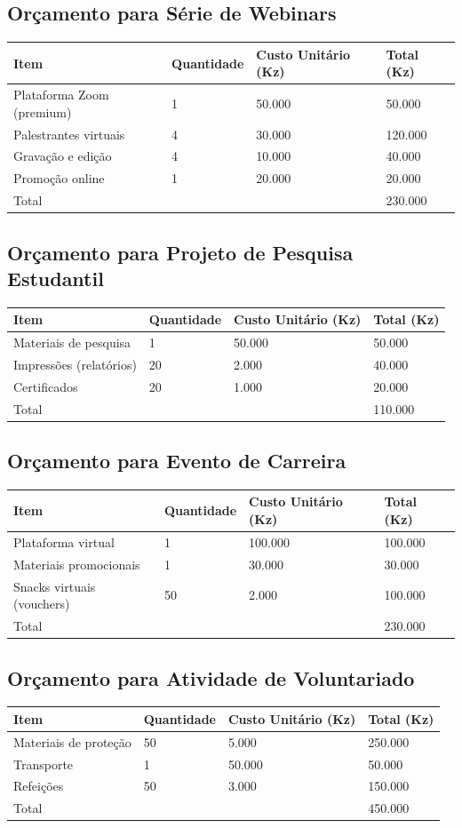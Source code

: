 \documentclass[12pt]{article}
\begin{document}
\subsection{Orçamento para Série de Webinars}
\begin{longtable}{|l|l|l|l|}
\hline
Item & Quantidade & Custo Unitário (Kz) & Total (Kz) \\
\hline
Plataforma Zoom (premium) & 1 & 50.000 & 50.000 \\
Palestrantes virtuais & 4 & 30.000 & 120.000 \\
Gravação e edição & 4 & 10.000 & 40.000 \\
Promoção online & 1 & 20.000 & 20.000 \\
\hline
Total & & & 230.000 \\
\hline
\end{longtable}

\subsection{Orçamento para Projeto de Pesquisa Estudantil}
\begin{longtable}{|l|l|l|l|}
\hline
Item & Quantidade & Custo Unitário (Kz) & Total (Kz) \\
\hline
Materiais de pesquisa & 1 & 50.000 & 50.000 \\
Impressões (relatórios) & 20 & 2.000 & 40.000 \\
Certificados & 20 & 1.000 & 20.000 \\
\hline
Total & & & 110.000 \\
\hline
\end{longtable}

\subsection{Orçamento para Evento de Carreira}
\begin{longtable}{|l|l|l|l|}
\hline
Item & Quantidade & Custo Unitário (Kz) & Total (Kz) \\
\hline
Plataforma virtual & 1 & 100.000 & 100.000 \\
Materiais promocionais & 1 & 30.000 & 30.000 \\
Snacks virtuais (vouchers) & 50 & 2.000 & 100.000 \\
\hline
Total & & & 230.000 \\
\hline
\end{longtable}

\subsection{Orçamento para Atividade de Voluntariado}
\begin{longtable}{|l|l|l|l|}
\hline
Item & Quantidade & Custo Unitário (Kz) & Total (Kz) \\
\hline
Materiais de proteção & 50 & 5.000 & 250.000 \\
Transporte & 1 & 50.000 & 50.000 \\
Refeições & 50 & 3.000 & 150.000 \\
\hline
Total & & & 450.000 \\
\hline
\end{longtable}
\end{document}
